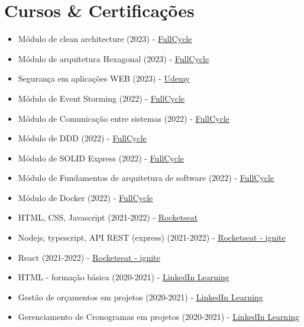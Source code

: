 \documentclass[11pt,a4paper,sans]{moderncv}
\begin{document}
\section{Cursos \& Certificações}
 {\begin{itemize}[label=\textbullet]
	  \item Módulo de clean architecture (2023) - \underline{\color{blue}\href{https://fullcycle.com}{FullCycle}}
	  \item Módulo de arquitetura Hexagonal (2023) - \underline{\color{blue}\href{https://fullcycle.com}{FullCycle}}
	  \item Segurança em aplicações WEB (2023) - \underline{\color{blue}\href{https://udemy.com}{Udemy}}
	  \item Módulo de Event Storming (2022) - \underline{\color{blue}\href{https://fullcycle.com}{FullCycle}}
	  \item Módulo de Comunicação entre sistemas (2022) - \underline{\color{blue}\href{https://fullcycle.com}{FullCycle}}
	  \item Módulo de DDD (2022) - \underline{\color{blue}\href{https://fullcycle.com}{FullCycle}}
	  \item Módulo de SOLID Express (2022) - \underline{\color{blue}\href{https://fullcycle.com}{FullCycle}}
	  \item Módulo de Fundamentos de arquitetura de software (2022) - \underline{\color{blue}\href{https://fullcycle.com}{FullCycle}}
	  \item Módulo de Docker (2022) - \underline{\color{blue}\href{https://fullcycle.com}{FullCycle}}
	  \item HTML, CSS, Javascript (2021-2022) - \underline{\color{blue}\href{https://rocketseat.com.br}{Rocketseat}}
	  \item Nodejs, typescript, API REST (express) (2021-2022) - \underline{\color{blue}\href{https://rocketseat.com.br}{Rocketseat - ignite}}
	  \item React (2021-2022) - \underline{\color{blue}\href{https://rocketseat.com.br}{Rocketseat - ignite}}
	  \item HTML - formação básica (2020-2021) - \underline{\color{blue}\href{https://linkedin.com/learning}{LinkedIn Learning}}
	  \item Gestão de orçamentos em projetos (2020-2021) - \underline{\color{blue}\href{https://linkedin.com/learning}{LinkedIn Learning}}
	  \item Gerenciamento de Cronogramas em projetos (2020-2021) - \underline{\color{blue}\href{https://linkedin.com/learning}{LinkedIn Learning}}

\end{itemize}}
\end{document}
